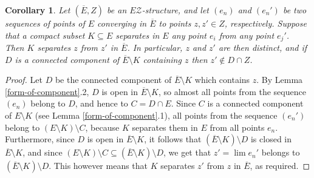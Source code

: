 \documentclass[10pt,a4paper]{amsart}
\newtheorem{cor}{Corollary}
\newcommand{\ol}[1]{\overline{#1}}
\begin{document}
\begin{cor}\label{separation-of-two-limits}
Let $(\ol E,Z)$ be an $E\mathcal{Z}$-structure, and let 
$(e_n)$ and $(e_n')$ be two sequences of points of $E$
converging in $\ol E$ to points $z,z'\in Z$, respectively. 
Suppose that a compact subset $K\subseteq E$ separates in $E$
any point $e_i$ from any point $e_j'$. Then $K$ separates $z$
from $z'$ in $\ol E$. In particular, $z$ and $z'$ are then distinct,
and if $D$ is a connected component of $\ol E\setminus K$
containing $z$ then 
$z'\notin D\cap Z$. 
\end{cor}

\begin{proof}
Let $D$ be the connected component of $\ol E\setminus K$ which
contains $z$. By Lemma \ref{form-of-component}.2, 
$D$ is open in $\ol E\setminus K$,
so almost all points from the sequence $(e_n)$ belong to $D$,
and hence to $C=D\cap E$. Since $C$ is a connected component
of $E\setminus K$ (see Lemma \ref{form-of-component}.1), 
all points from the sequence
$(e_n')$ belong to $(E\setminus K)\setminus C$, because $K$ separates them 
in $E$ from all points $e_n$. Furthermore, since $D$ is open in 
$\ol E\setminus K$, it follows that $(\ol E\setminus K)\setminus D$
is closed in $\ol E\setminus K$, and since
$(E\setminus K)\setminus C\subseteq(\ol E\setminus K)\setminus D$,
we get that $z'=\lim e_n'$ belongs to $(\ol E\setminus K)\setminus D$.
This however means that $K$ separates $z'$ from $z$ in $\ol E$,
as required.
\end{proof}
\end{document}
